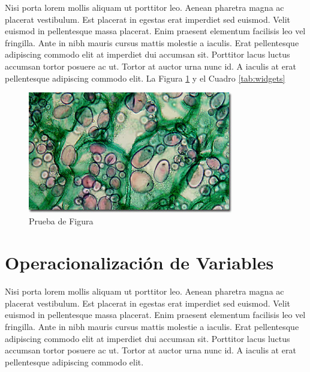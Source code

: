  Nisi porta lorem mollis aliquam ut porttitor leo. Aenean pharetra magna ac placerat vestibulum. Est placerat in egestas erat imperdiet sed euismod. Velit euismod in pellentesque massa placerat. Enim praesent elementum facilisis leo vel fringilla. Ante in nibh mauris cursus mattis molestie a iaculis. Erat pellentesque adipiscing commodo elit at imperdiet dui accumsan sit. Porttitor lacus luctus accumsan tortor posuere ac ut. Tortor at auctor urna nunc id. A iaculis at erat pellentesque adipiscing commodo elit. La Figura \ref{fig1} y el Cuadro \ref{tab:widgets}

	\begin{figure}[h]
		\begin{center}
			\includegraphics[width=0.8\textwidth]{3/figures/largepotato.jpg}
			\caption{Prueba de Figura}
			\label{fig1}
		\end{center}
		
	\end{figure}


\section{Operacionalización de Variables}

Nisi porta lorem mollis aliquam ut porttitor leo. Aenean pharetra magna ac placerat vestibulum. Est placerat in egestas erat imperdiet sed euismod. Velit euismod in pellentesque massa placerat. Enim praesent elementum facilisis leo vel fringilla. Ante in nibh mauris cursus mattis molestie a iaculis. Erat pellentesque adipiscing commodo elit at imperdiet dui accumsan sit. Porttitor lacus luctus accumsan tortor posuere ac ut. Tortor at auctor urna nunc id. A iaculis at erat pellentesque adipiscing commodo elit.
